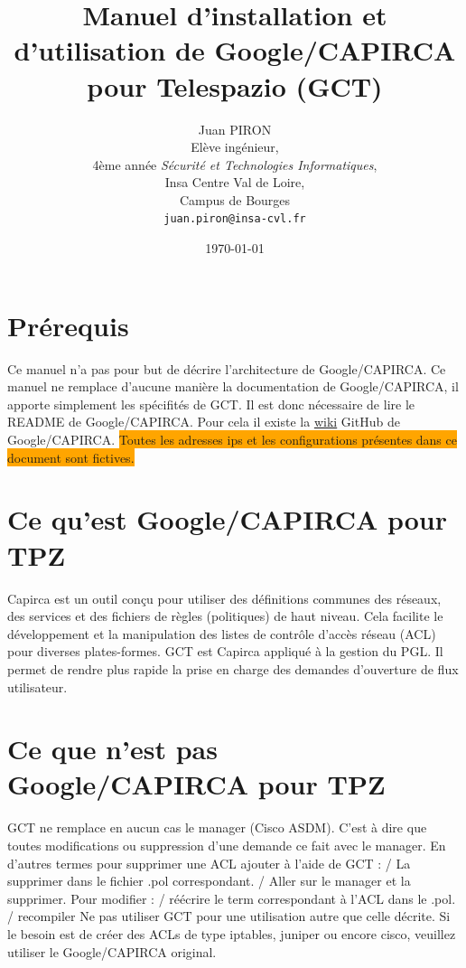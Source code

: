 \documentclass{article}
\title{Manuel d'installation et d'utilisation de Google/CAPIRCA pour Telespazio (GCT)}
\author{Juan PIRON\\
   Elève ingénieur,\\
   4ème année \textit{Sécurité et Technologies Informatiques},\\
   {\color{red} Insa Centre Val de Loire},\\
   {\color{green} Campus de Bourges}\\
   \texttt{juan.piron@insa-cvl.fr}
}
\date{\today}
\begin{document}
  \maketitle

  \newpage
  \tableofcontents
  \newpage

  \section{Prérequis}

    \justify
    Ce manuel n'a pas pour but de décrire l'architecture de Google/CAPIRCA.
    Ce manuel ne remplace d'aucune manière la documentation de Google/CAPIRCA, il apporte simplement les spécifités de GCT.
    Il est donc nécessaire de lire le README de Google/CAPIRCA.
    Pour cela il existe la \href{https://github.com/google/capirca/wiki}{wiki} GitHub de Google/\-CAPIRCA.
    \bigbreak
    \centering
    \colorbox{orange}{Toutes les adresses ips et les configurations présentes dans ce document sont fictives.}
    \justify

  \section{Ce qu'est Google/CAPIRCA pour TPZ}

    \noindent Capirca est un outil conçu pour utiliser des définitions communes des réseaux, des services et des fichiers de règles (politiques) de haut niveau.
    Cela facilite le développement et la manipulation des listes de contrôle d'accès réseau (ACL) pour diverses plates-formes.
    GCT est Capirca appliqué à la gestion du PGL. Il permet de rendre plus rapide la prise en charge des demandes d'ouverture de flux utilisateur.
    \smallbreak

  \section{Ce que n'est pas Google/CAPIRCA pour TPZ}

    \noindent GCT ne remplace en aucun cas le manager (Cisco ASDM). C'est à dire que toutes modifications ou suppression d'une demande ce fait avec le manager.
    En d'autres termes pour supprimer une ACL ajouter à l'aide de GCT : / La supprimer dans le fichier .pol correspondant. / Aller sur le manager et la supprimer. \bigbreak
    \noindent Pour modifier : / réécrire le term correspondant à l'ACL dans le .pol. / recompiler \smallbreak
    \noindent Ne pas utiliser GCT pour une utilisation autre que celle décrite. Si le besoin est de créer des ACLs de type iptables,
    juniper ou encore cisco, veuillez utiliser le Google/CAPIRCA original.
\end{document}
